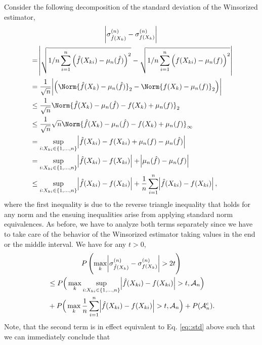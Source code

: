 Consider the following decomposition of the standard deviation of the Winsorized estimator,
\begin{multline*}
        \abs{\sigma^{(n)}_{\hat{f}(X_k)} - \sigma^{(n)}_{f(X_k)}} \\
        \begin{aligned}
        &= \abs{\sqrt{1/n\sum_{i=1}^n \Big(\hat{f}(X_{ki}) - \mu_n(\hat{f})\Big)^2} - \sqrt{1/n\sum_{i=1}^n \Big(f(X_{ki}) - \mu_n(f)\Big)^2}} \\
        &= \frac{1}{\sqrt{n}}\abs{\Big( \Norm{\hat{f}(X_k) - \mu_n(\hat{f})}_2 - \Norm{f(X_k) - \mu_n(f)}_2 \Big)} \\
        &\leq \frac{1}{\sqrt{n}} \Norm{\hat{f}(X_k) - \mu_n(\hat{f}) - f(X_k) + \mu_n(f)}_2 \\
        &\leq \frac{1}{\sqrt{n}} \sqrt{n}\Norm{\hat{f}(X_k) - \mu_n(\hat{f}) - f(X_k) + \mu_n(f)}_\infty \\
        &= \sup_{i: X_{ki} \in \{1,\dots,n\}} \abs{\hat{f}(X_{ki}) - f(X_{ki}) + \mu_n(f) - \mu_n(\hat{f})} \\
        &= \sup_{i: X_{ki} \in \{1,\dots,n\}} \abs{\hat{f}(X_{ki}) - f(X_{ki})} + \abs{\mu_n(\hat{f}) - \mu_n(f)} \\
        &\leq \sup_{i: X_{ki} \in \{1,\dots,n\}} \abs{\hat{f}(X_{ki}) - f(X_{ki})} + \frac{1}{n} \sum_{i=1}^n \abs{\hat{f}(X_{ki}) - f(X_{ki})},
        \end{aligned}
\end{multline*}
where the first inequality is due to the reverse triangle inequality that holds for any norm and the ensuing inequalities arise from applying standard norm equivalences. As before, we have to analyze both terms separately since we have to take care of the behavior of the Winsorized estimator taking values in the end or the middle interval. We have for any $t > 0$,
\begin{multline*}
        P\left(\max_k \abs{\sigma^{(n)}_{\hat{f}(X_k)} - \sigma^{(n)}_{f(X_k)}} > 2t \right) \\
        \begin{aligned}
        &\leq P\Big(\max_k \sup_{i: X_{ki} \in \{1,\dots,n\}} \abs{\hat{f}(X_{ki}) - f(X_{ki})} > t, \mathcal{A}_n\Big) \\
        &+ P\Big(\max_k \frac{1}{n} \sum_{i=1}^n \abs{\hat{f}(X_{ki}) - f(X_{ki})} > t, \mathcal{A}_n\Big) + P(\mathcal{A}_n^c).
        \end{aligned}
\end{multline*}
Note, that the second term is in effect equivalent to Eq. \eqref{eq::std} above such that we can immediately conclude that   
